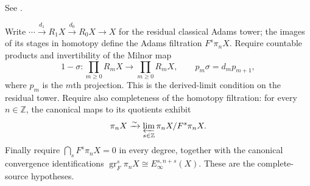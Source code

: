 \begin{definition}
\label{sem:Literature:bhs-applicability}
See \cite[Definition A.12]{BHS}.\par

Write
$\cdots\xrightarrow{d_1}R_1X\xrightarrow{d_0}R_0X\to X$
for the residual classical Adams tower; the images of its stages in
homotopy define the Adams filtration $F^s\pi_nX$. Require countable
products and invertibility of the Milnor map
\[
 1-\sigma:\prod_{m\ge0}R_mX\longrightarrow\prod_{m\ge0}R_mX,
 \qquad p_m\sigma=d_m p_{m+1},
\]
where $p_m$ is the $m$th projection. This is the derived-limit condition
on the residual tower. Require also completeness of the
homotopy filtration: for every $n\in\mathbb Z$, the canonical maps
to its quotients exhibit
\[
 \pi_nX\xrightarrow{\sim}
 \varprojlim_{s\in\mathbb Z}\pi_nX/F^s\pi_nX.
\]
Finally require $\bigcap_sF^s\pi_nX=0$ in every degree, together with
the canonical convergence identifications
$\operatorname{gr}_F^s\pi_nX\cong E_\infty^{s,n+s}(X)$.
These are the complete-source hypotheses.

\end{definition}

